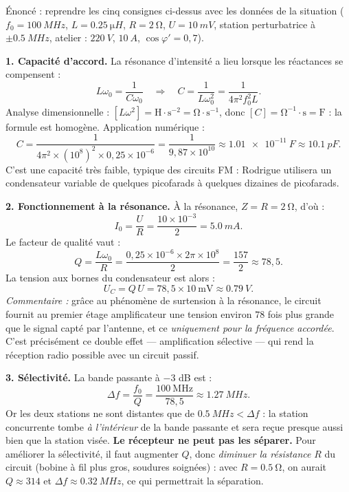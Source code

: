 \documentclass[11pt]{article}
\newcommand{\cle}[1]{{\popxbold\color{popdark}#1}}
\begin{document}
\begin{exoresolu}
Énoncé : reprendre les cinq consignes ci-dessus avec les données de la situation ($f_0 = \SI{100}{MHz}$, $L = \SI{0,25}{\micro H}$, $R = \SI{2}{\ohm}$, $U = \SI{10}{mV}$, station perturbatrice à $\pm \SI{0,5}{MHz}$, atelier : $\SI{220}{V}$, $\SI{10}{A}$, $\cos\varphi' = 0,7$).

\tcblower

\textbf{1. Capacité d'accord.} La résonance d'intensité a lieu lorsque les réactances se compensent :
\[
L\omega_0 = \frac{1}{C\omega_0} \quad\Longrightarrow\quad C = \frac{1}{L\omega_0^2} = \frac{1}{4\pi^2 f_0^2 L}.
\]
Analyse dimensionnelle : $[L\omega^2] = \mathrm{H \cdot s^{-2}} = \mathrm{\Omega \cdot s^{-1}}$, donc $[C] = \mathrm{\Omega^{-1} \cdot s} = \mathrm{F}$ : la formule est homogène. Application numérique :
\[
C = \frac{1}{4\pi^2 \times (10^8)^2 \times 0{,}25\times 10^{-6}} = \frac{1}{9{,}87\times 10^{10}} \approx \SI{1,01e-11}{F} \approx \SI{10,1}{pF}.
\]
C'est une capacité très faible, typique des circuits FM : Rodrigue utilisera un condensateur variable de quelques picofarads à quelques dizaines de picofarads.

\textbf{2. Fonctionnement à la résonance.} À la résonance, $Z = R = \SI{2}{\ohm}$, d'où :
\[
I_0 = \frac{U}{R} = \frac{10\times 10^{-3}}{2} = \SI{5,0}{mA}.
\]
Le facteur de qualité vaut :
\[
Q = \frac{L\omega_0}{R} = \frac{0{,}25\times 10^{-6} \times 2\pi \times 10^8}{2} = \frac{157}{2} \approx 78{,}5.
\]
La tension aux bornes du condensateur est alors :
\[
U_C = Q\,U = 78{,}5 \times 10\ \mathrm{mV} \approx \SI{0,79}{V}.
\]
\textit{Commentaire :} grâce au phénomène de \cle{surtension} à la résonance, le circuit fournit au premier étage amplificateur une tension environ $78$ fois plus grande que le signal capté par l'antenne, et ce \emph{uniquement pour la fréquence accordée}. C'est précisément ce double effet — amplification sélective — qui rend la réception radio possible avec un circuit passif.

\textbf{3. Sélectivité.} La bande passante à $-3$ dB est :
\[
\Delta f = \frac{f_0}{Q} = \frac{100\ \mathrm{MHz}}{78{,}5} \approx \SI{1,27}{MHz}.
\]
Or les deux stations ne sont distantes que de $\SI{0,5}{MHz} < \Delta f$ : la station concurrente tombe \emph{à l'intérieur} de la bande passante et sera reçue presque aussi bien que la station visée. \textbf{Le récepteur ne peut pas les séparer.} Pour améliorer la sélectivité, il faut augmenter $Q$, donc \emph{diminuer la résistance} $R$ du circuit (bobine à fil plus gros, soudures soignées) : avec $R = \SI{0,5}{\ohm}$, on aurait $Q \approx 314$ et $\Delta f \approx \SI{0,32}{MHz}$, ce qui permettrait la séparation.


\end{exoresolu}
\end{document}
